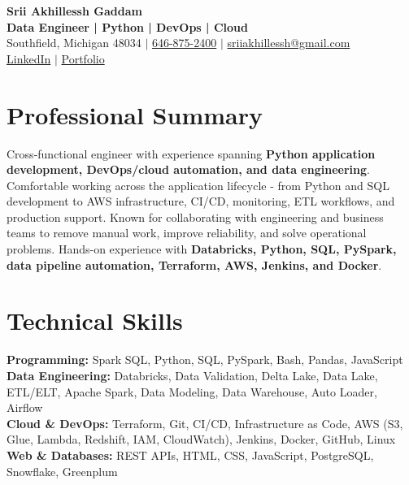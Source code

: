 \documentclass[letterpaper,10pt]{article}
\begin{document}
\fontsize{9.35pt}{10.45pt}\selectfont

\begin{center}
    {\LARGE \textbf{Srii Akhillessh Gaddam}} \\[-1pt]
    \textbf{Data Engineer | Python | DevOps | Cloud} \\[2pt]
    Southfield, Michigan 48034 $|$
    \href{tel:6468752400}{646-875-2400} $|$
    \href{mailto:sriiakhillessh@gmail.com}{sriiakhillessh@gmail.com} \\[1pt]
    \href{https://www.linkedin.com/in/srii-akhiilessh-gaddam-b48668191/}{LinkedIn} $|$
    \href{https://sriiakhillesshg.github.io/portfolio/}{Portfolio}
\end{center}
\vspace{-8pt}

\section{Professional Summary}
\small{Cross-functional engineer with experience spanning \textbf{Python application development, DevOps/cloud automation, and data engineering}. Comfortable working across the application lifecycle - from Python and SQL development to AWS infrastructure, CI/CD, monitoring, ETL workflows, and production support. Known for collaborating with engineering and business teams to remove manual work, improve reliability, and solve operational problems. Hands-on experience with \textbf{Databricks, Python, SQL, PySpark, data pipeline automation, Terraform, AWS, Jenkins, and Docker}.}

\section{Technical Skills}
\small{
\textbf{Programming:} Spark SQL, Python, SQL, PySpark, Bash, Pandas, JavaScript \\
\textbf{Data Engineering:} Databricks, Data Validation, Delta Lake, Data Lake, ETL/ELT, Apache Spark, Data Modeling, Data Warehouse, Auto Loader, Airflow \\
\textbf{Cloud \& DevOps:} Terraform, Git, CI/CD, Infrastructure as Code, AWS (S3, Glue, Lambda, Redshift, IAM, CloudWatch), Jenkins, Docker, GitHub, Linux \\
\textbf{Web \& Databases:} REST APIs, HTML, CSS, JavaScript, PostgreSQL, Snowflake, Greenplum
}
\end{document}
